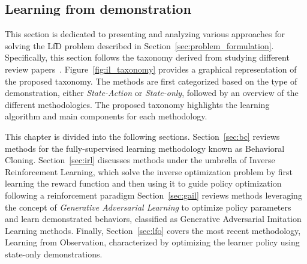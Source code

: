 \subsection{Learning from demonstration}
\label{sec:lfd}
This section is dedicated to presenting and analyzing various approaches for solving the LfD problem described in Section~\ref{sec:problem_formulation}. Specifically, this section follows the taxonomy derived from studying different review papers~\cite{kaelbling1996reinforcement_survey,argall2009robot_learning_from_demonstration,hussein2017imitation_learning_survey,fang2019survey,zheng2021imitation_progress_taxonomies_opportunities,zare2024survey}. Figure~\ref{fig:il_taxonomy} provides a graphical representation of the proposed taxonomy. The methods are first categorized based on the type of demonstration, either \textit{State-Action} or \textit{State-only}, followed by an overview of the different methodologies. The proposed taxonomy highlights the learning algorithm and main components for each methodology.

This chapter is divided into the following sections. Section~\ref{sec:bc} reviews methods for the fully-supervised learning methodology known as Behavioral Cloning. 
\newline Section~\ref{sec:irl} discusses methods under the umbrella of Inverse Reinforcement Learning, which solve the inverse optimization problem by first learning the reward function and then using it to guide policy optimization following a reinforcement paradigm
\newline Section~\ref{sec:gail} reviews methods leveraging the concept of \textit{Generative Adversarial Learning} to optimize policy parameters and learn demonstrated behaviors, classified as Generative Adversarial Imitation Learning methods.
\newline Finally, Section~\ref{sec:lfo} covers the most recent methodology, Learning from Observation, characterized by optimizing the learner policy using state-only demonstrations.










